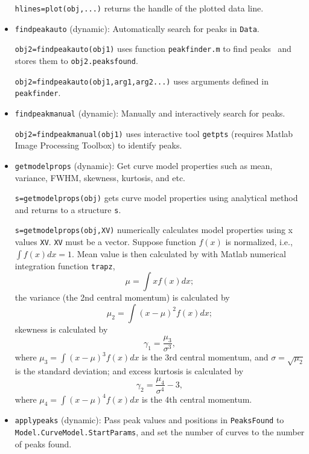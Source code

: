 \documentclass[reprint,showpacs,prb,nofootinbib,amsmath,amssymb]{revtex4-1}
\begin{document}
\begin{itemize}
\verb|hlines=plot(obj,...)| returns the handle of the plotted data line.

\item \verb|findpeakauto| (dynamic): Automatically search for peaks in \verb|Data|.

\verb|obj2=findpeakauto(obj1)| uses function \verb|peakfinder.m| to find peaks~\cite{peakfinder} and stores them to \verb|obj2.peaksfound|.

\verb|obj2=findpeakauto(obj1,arg1,arg2...)| uses arguments defined in \verb|peakfinder|.

\item \verb|findpeakmanual| (dynamic): Manually and interactively search for peaks.

\verb|obj2=findpeakmanual(obj1)| uses interactive tool \verb|getpts| (requires Matlab Image Processing Toolbox) to identify peaks.

\item \verb|getmodelprops| (dynamic): Get curve model properties such as mean, variance, FWHM, skewness, kurtosis, and etc.

\verb|s=getmodelprops(obj)| gets curve model properties using analytical method and returns to a structure \verb|s|. 

\verb|s=getmodelprops(obj,XV)| numerically calculates model properties using x values \verb|XV|. \verb|XV| must be a vector. Suppose function $f(x)$ is normalized, i.e., $\int{f(x)dx}=1$. Mean value is then calculated by with Matlab numerical integration function \verb|trapz|,
\begin{equation}
\mu=\int{xf(x)dx}; \nonumber
\end{equation}
the variance (the 2nd central momentum) is calculated by
\begin{equation}
\mu_2=\int{(x-\mu)^2f(x)dx}; \nonumber
\end{equation}
skewness is calculated by
\begin{equation}
\gamma_1=\frac{\mu_3}{\sigma^3},\nonumber
\end{equation}
where $\mu_3=\int{(x-\mu)^3f(x)dx}$ is the 3rd central momentum, and $\sigma=\sqrt{\mu_2}$ is the standard deviation; and excess kurtosis is calculated by
\begin{equation}
\gamma_2=\frac{\mu_4}{\sigma^4}-3,\nonumber
\end{equation}
where $\mu_4=\int{(x-\mu)^4f(x)dx}$ is the 4th central momentum.

\item \verb|applypeaks| (dynamic): Pass peak values and positions in \verb|PeaksFound| to \verb|Model.CurveModel.StartParams|, and set the number of curves to the number of peaks found.


\end{itemize}
\end{document}

